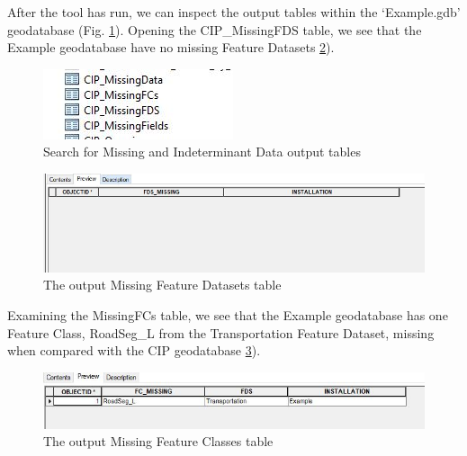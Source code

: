 \documentclass[openany]{book}
\theoremstyle{definition}
\theoremstyle{definition}
\theoremstyle{definition}
\theoremstyle{remark}
\begin{document}
After the tool has run, we can inspect the output tables within the
`Example.gdb' geodatabase (Fig. \ref{fig:indtSearchtables}). Opening the
CIP\_MissingFDS table, we see that the Example geodatabase have no
missing Feature Datasets \ref{fig:indtSearchmissingFDS}).

\begin{figure}[H]

{\centering \includegraphics{figures/indtSearch-tables} 

}

\caption{Search for Missing and Indeterminant Data output tables}\label{fig:indtSearchtables}
\end{figure}\begin{figure}[H]

{\centering \includegraphics{figures/indtSearch-missingFDS} 

}

\caption{The output Missing Feature Datasets table}\label{fig:indtSearchmissingFDS}
\end{figure}

Examining the MissingFCs table, we see that the Example geodatabase has
one Feature Class, RoadSeg\_L from the Transportation Feature Dataset,
missing when compared with the CIP geodatabase
\ref{fig:indtSearchmissingFCs}).

\begin{figure}[H]

{\centering \includegraphics{figures/indtSearch-missingFCs} 

}

\caption{The output Missing Feature Classes table}\label{fig:indtSearchmissingFCs}
\end{figure}
\end{document}
